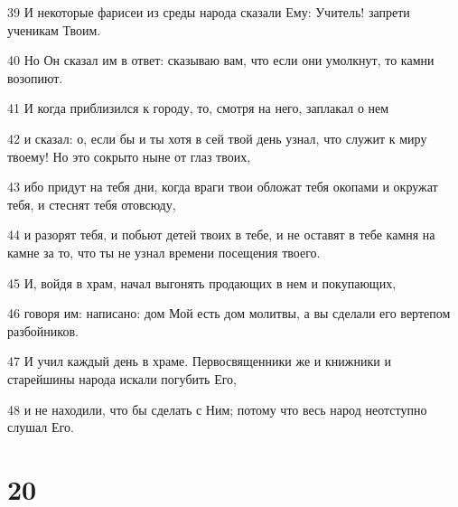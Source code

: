 \par 39 И некоторые фарисеи из среды народа сказали Ему: Учитель! запрети ученикам Твоим.
\par 40 Но Он сказал им в ответ: сказываю вам, что если они умолкнут, то камни возопиют.
\par 41 И когда приблизился к городу, то, смотря на него, заплакал о нем
\par 42 и сказал: о, если бы и ты хотя в сей твой день узнал, что служит к миру твоему! Но это сокрыто ныне от глаз твоих,
\par 43 ибо придут на тебя дни, когда враги твои обложат тебя окопами и окружат тебя, и стеснят тебя отовсюду,
\par 44 и разорят тебя, и побьют детей твоих в тебе, и не оставят в тебе камня на камне за то, что ты не узнал времени посещения твоего.
\par 45 И, войдя в храм, начал выгонять продающих в нем и покупающих,
\par 46 говоря им: написано: дом Мой есть дом молитвы, а вы сделали его вертепом разбойников.
\par 47 И учил каждый день в храме. Первосвященники же и книжники и старейшины народа искали погубить Его,
\par 48 и не находили, что бы сделать с Ним; потому что весь народ неотступно слушал Его.

\chapter{20}

